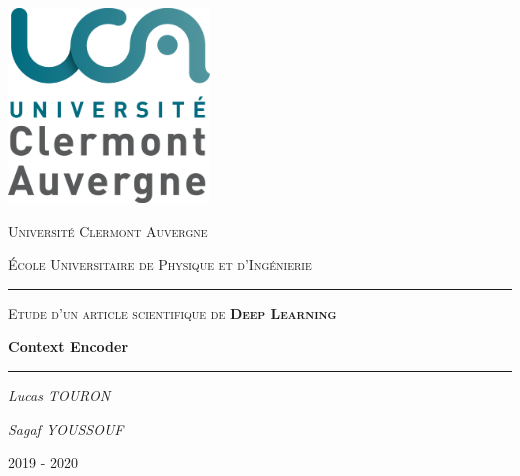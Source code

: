 \documentclass[11pt,a4paper]{article}
\begin{document}
    \begin{titlepage}
        \centering
        \includegraphics[width=0.40\textwidth]{uca.png}\par\vspace{1cm}
        {\scshape\LARGE Université Clermont Auvergne \par}
        {\scshape École Universitaire de Physique et d'Ingénierie \par}
        \vspace{2cm}
        \noindent\rule{\textwidth}{0.5pt}\par
        {\scshape\Large Etude d'un article scientifique de \textbf{Deep Learning}\par}
        \vspace{0.5cm}
        {\huge\bfseries Context Encoder\par}
        \noindent\rule{\textwidth}{0.5pt}\par
        \vspace{5cm}
        {\Large\itshape Lucas TOURON\par}
        {\Large\itshape Sagaf YOUSSOUF\par}

        \vfill

        {\large 2019 - 2020\par}
    \end{titlepage}



    \tableofcontents
    \newpage
    
    
    
\end{document}
